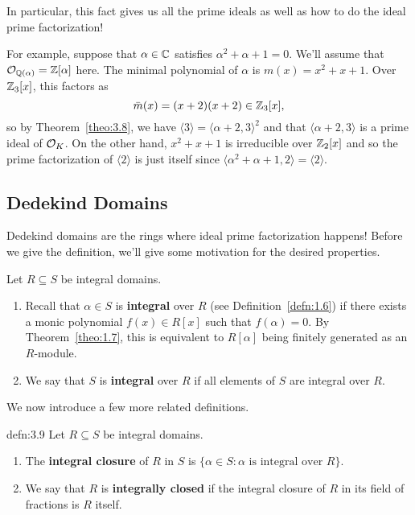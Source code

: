 In particular, this fact gives us all the prime ideals as well as how 
to do the ideal prime factorization! 

For example, suppose that $\alpha \in \mathbb{C}$ satisfies $\alpha^2 + \alpha + 1 = 0$. 
We'll assume that ${\cal O}_{\mathbb{Q}(\alpha)} = \mathbb{Z}[\alpha]$ here. The minimal 
polynomial of $\alpha$ is $m(x) = x^2 + x + 1$. Over $\mathbb{Z}_3[x]$, this factors as 
\[ \bar{m}(x) = (x+2)(x+2) \in \mathbb{Z}_3[x], \] 
so by Theorem~\ref{theo:3.8}, we have $\langle 3 \rangle = \langle \alpha + 2, 3 \rangle^2$ 
and that $\langle \alpha + 2, 3 \rangle$ is a prime ideal of ${\cal O}_K$. 
On the other hand, $x^2 + x + 1$ is irreducible over $\mathbb{Z}_2[x]$ and so 
the prime factorization of $\langle 2 \rangle$ is just itself since 
$\langle \alpha^2 + \alpha + 1, 2 \rangle = \langle 2 \rangle$.

\subsection{Dedekind Domains} \label{subsec:3.3}
Dedekind domains are the rings where ideal prime factorization happens! 
Before we give the definition, we'll give some motivation for the 
desired properties.

Let $R \subseteq S$ be integral domains. 
\begin{enumerate}[(1)]
    \item Recall that $\alpha \in S$ is {\bf integral} over $R$ 
    (see Definition~\ref{defn:1.6}) if there exists a monic polynomial 
    $f(x) \in R[x]$ such that $f(\alpha) = 0$. By Theorem~\ref{theo:1.7},
    this is equivalent to $R[\alpha]$ being finitely generated as an $R$-module.
    \item We say that $S$ is {\bf integral} over $R$ if all elements of 
    $S$ are integral over $R$. 
\end{enumerate}

We now introduce a few more related definitions.

\begin{defn}{defn:3.9}
    Let $R \subseteq S$ be integral domains. 
    \begin{enumerate}[(1)]
        \item The {\bf integral closure} of $R$ in $S$ is 
        $\{\alpha \in S : \alpha \text{ is integral over } R\}$.
        \item We say that $R$ is {\bf integrally closed} if the integral 
        closure of $R$ in its field of fractions is $R$ itself. 
    \end{enumerate}
\end{defn}\vspace{-0.25cm}

